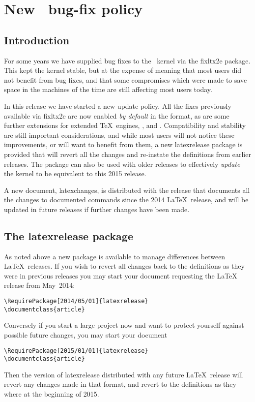 \documentclass{ltnews}
\begin{document}
\maketitle

\section{New \LaTeXe\ bug-fix policy}

\subsection{Introduction}

For some years we have supplied bug fixes to the \LaTeXe\ kernel via the
\textsf{fixltx2e} package. This
kept the kernel stable, but at the expense of meaning that most users did not
benefit from bug fixes, and that some compromises 
which were made to save space in the
machines of the time are still affecting most users today.

In this release we have started a new update policy. All the fixes previously
available via \textsf{fixltx2e} are now enabled \emph{by default} in the
format, as are some further extensions for extended \TeX\ engines, \eTeX,
 and . Compatibility and stability are still
important considerations, and while most users will not notice these
improvements, or will want to benefit from them, a new \textsf{latexrelease}
package is provided that will revert all the changes and re-instate the
definitions from earlier releases. The package can also be used with older
releases to effectively \emph{update} the kernel to be equivalent to this 2015
release.

A new document, \textsf{latexchanges}, is distributed with the release
that documents all the changes to documented commands since the 2014
\LaTeX\ release, and will be updated in future releases if further
changes have been made.

\subsection{The \textsf{latexrelease} package}

As noted above a new package is available to manage differences between \LaTeX\
releases. If you wish to revert all changes back to the definitions as they
were in previous releases you may start your document requesting the \LaTeX{} release from May~2014:
\begin{verbatim}
\RequirePackage[2014/05/01]{latexrelease}
\documentclass{article}
\end{verbatim}
Conversely if you start a large project now and want to protect yourself
against possible future changes, you may start your document
\begin{verbatim}
\RequirePackage[2015/01/01]{latexrelease}
\documentclass{article}
\end{verbatim}
Then the version of \textsf{latexrelease} distributed with any future \LaTeX\
release will revert any changes made in that format, and revert to the
definitions as they where at the beginning of 2015.
\end{document}
